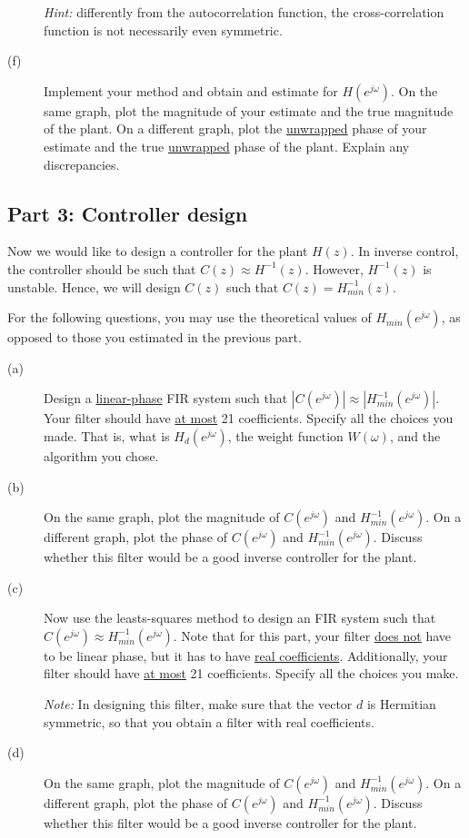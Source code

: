 \documentclass[12pt]{report}
\begin{document}
\begin{description}
	\textit{Hint:} differently from the autocorrelation function, the cross-correlation function is not necessarily even symmetric.
		
	\item [(f)] Implement your method and obtain and estimate for $H(e^{j\omega})$. On the same graph, plot the magnitude of your estimate and the true magnitude of the plant. On a different graph, plot the \underline{unwrapped} phase of your estimate and the true \underline{unwrapped} phase of the plant. Explain any discrepancies.
\end{description}

\subsection*{Part 3: Controller design}
Now we would like to design a controller for the plant $H(z)$. In inverse control, the controller should be such that $C(z) \approx H^{-1}(z)$. However, $H^{-1}(z)$ is unstable. Hence, we will design $C(z)$ such that $C(z) = H^{-1}_{min}(z)$.

For the following questions, you may use the theoretical values of $H_{min}(e^{j\omega})$, as opposed to those you estimated in the previous part.

\begin{description}
	\item [(a)] Design a \underline{linear-phase} FIR system such that $|C(e^{j\omega})| \approx |H^{-1}_{min}(e^{j\omega})|$. Your filter should have \underline{at most} 21 coefficients. Specify all the choices you made. That is, what is $H_d(e^{j\omega})$, the weight function $W(\omega)$, and the algorithm you chose. 
	\item [(b)] On the same graph, plot the magnitude of $C(e^{j\omega})$ and $H^{-1}_{min}(e^{j\omega})$. On a different graph, plot the phase of $C(e^{j\omega})$ and $H^{-1}_{min}(e^{j\omega})$. Discuss whether this filter would be a good inverse controller for the plant.
	\item [(c)] Now use the leasts-squares method to design an FIR system such that $C(e^{j\omega}) \approx H^{-1}_{min}(e^{j\omega})$. Note that for this part, your filter \underline{does not} have to be linear phase, but it has to have \underline{real coefficients}. Additionally, your filter should have \underline{at most} 21 coefficients. Specify all the choices you make. 
	
	\textit{Note:} In designing this filter, make sure that the vector $d$ is Hermitian symmetric, so that you obtain a filter with real coefficients.
	
	\item [(d)] On the same graph, plot the magnitude of $C(e^{j\omega})$ and $H^{-1}_{min}(e^{j\omega})$. On a different graph, plot the phase of $C(e^{j\omega})$ and $H^{-1}_{min}(e^{j\omega})$. Discuss whether this filter would be a good inverse controller for the plant.
\end{description}
\end{document}
